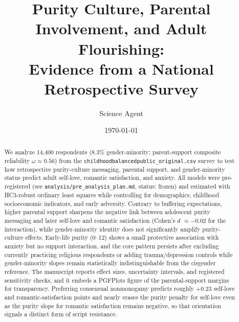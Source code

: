 \documentclass[12pt]{article}
\title{Purity Culture, Parental Involvement, and Adult Flourishing:\\Evidence from a National Retrospective Survey}
\author{Science Agent}
\date{\today}
\begin{document}
\maketitle

\begin{abstract}
We analyze 14,400 respondents (8.3\% gender-minority; parent-support composite reliability $\omega \approx 0.56$) from the \texttt{childhoodbalancedpublic\_original.csv} survey to test how retrospective purity-culture messaging, parental support, and gender-minority status predict adult self-love, romantic satisfaction, and anxiety. All models were pre-registered (see \texttt{analysis/pre\_analysis\_plan.md}, status: frozen) and estimated with HC3-robust ordinary least squares while controlling for demographics, childhood socioeconomic indicators, and early adversity. Contrary to buffering expectations, higher parental support sharpens the negative link between adolescent purity messaging and later self-love and romantic satisfaction (Cohen's $d$ $\approx -0.02$ for the interaction), while gender-minority identity does not significantly amplify purity-culture effects. Early-life purity (0--12) shows a small protective association with anxiety but no support interaction, and the core pattern persists after excluding currently practicing religious respondents or adding trauma/depression controls while gender-minority slopes remain statistically indistinguishable from the cisgender reference. The manuscript reports effect sizes, uncertainty intervals, and registered sensitivity checks, and it embeds a PGFPlots figure of the parental-support margins for transparency. Preferring consensual nonmonogamy predicts roughly +0.23 self-love and romantic-satisfaction points and nearly erases the purity penalty for self-love even as the purity slope for romantic satisfaction remains negative, so that orientation signals a distinct form of script resistance.
\end{abstract}
\end{document}
